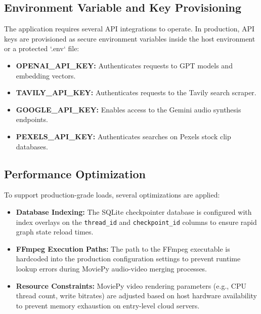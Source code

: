 \subsection{Environment Variable and Key Provisioning}
The application requires several API integrations to operate. In production, API keys are provisioned as secure environment variables inside the host environment or a protected `.env` file:
\begin{itemize}
    \item \textbf{OPENAI\_API\_KEY:} Authenticates requests to GPT models and embedding vectors.
    \item \textbf{TAVILY\_API\_KEY:} Authenticates requests to the Tavily search scraper.
    \item \textbf{GOOGLE\_API\_KEY:} Enables access to the Gemini audio synthesis endpoints.
    \item \textbf{PEXELS\_API\_KEY:} Authenticates searches on Pexels stock clip databases.
\end{itemize}

\subsection{Performance Optimization}
To support production-grade loads, several optimizations are applied:
\begin{itemize}
    \item \textbf{Database Indexing:} The SQLite checkpointer database is configured with index overlays on the \texttt{thread\_id} and \texttt{checkpoint\_id} columns to ensure rapid graph state reload times.
    \item \textbf{FFmpeg Execution Paths:} The path to the FFmpeg executable is hardcoded into the production configuration settings to prevent runtime lookup errors during MoviePy audio-video merging processes.
    \item \textbf{Resource Constraints:} MoviePy video rendering parameters (e.g., CPU thread count, write bitrates) are adjusted based on host hardware availability to prevent memory exhaustion on entry-level cloud servers.
\end{itemize}

